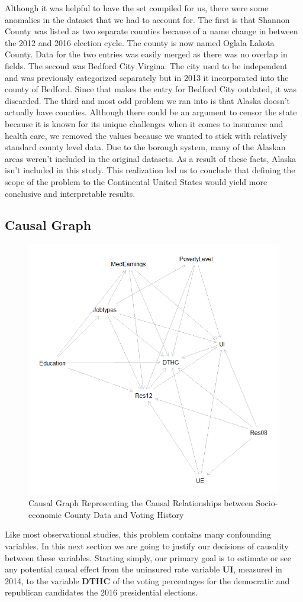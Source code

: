 \documentclass[11pt, conference,compsoc]{IEEEtran}
\begin{document}
Although it was helpful to have the set compiled for us, there were some anomalies in the dataset that we had to account for. The first is that Shannon County was listed as two separate counties because of a name change in between the 2012 and 2016 election cycle. The county is now named Oglala Lakota County. Data for the two entries was easily merged as there was no overlap in fields. The second was Bedford City Virgina. The city used to be independent and was previously categorized separately but in 2013 it incorporated into the county of Bedford. Since that makes the entry for Bedford City outdated, it was discarded. The third and most odd problem we ran into is that Alaska doesn't actually have counties. Although there could be an argument to censor the state because it is known for its unique challenges when it comes to insurance and health care, we removed the values because we wanted to stick with relatively standard county level data. Due to the borough system, many of the Alaskan areas weren't included in the original datasets. As a result of these facts, Alaska isn't included in this study. This realization led us to conclude that defining the scope of the problem to the Continental United States would yield more conclusive and interpretable results.

\subsection{Causal Graph}
\begin{figure} 
	\centering
	\includegraphics[width=.7\textwidth]{dag}
	\caption{Causal Graph Representing the Causal Relationships between Socio-economic County Data and Voting History}
    \label{dag}
\end{figure}
Like most observational studies, this problem contains many confounding variables. In this next section we are going to justify our decisions of causality between these variables. Starting simply, our primary goal is to estimate or see any potential causal effect from the uninsured rate variable \textbf{UI}, measured in 2014, to the variable \textbf{DTHC} of the voting percentages for the democratic and republican candidates the 2016 presidential elections. 
\end{document}
